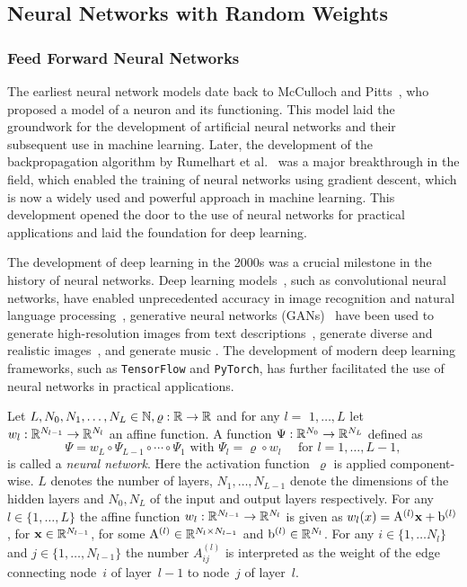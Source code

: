 \subsection{Neural Networks with Random Weights}

\subsubsection{Feed Forward Neural Networks}
The earliest neural network models date back to McCulloch and Pitts~\cite{McCulloch1943AActivity}, who proposed a model of a neuron and its functioning. This model laid the groundwork for the development of artificial neural networks and their subsequent use in machine learning. Later, the development of the backpropagation algorithm by Rumelhart et al.~\cite{Rumelhart1986LearningErrors} was a major breakthrough in the field, which enabled the training of neural networks using gradient descent, which is now a widely used and powerful approach in machine learning. This development opened the door to the use of neural networks for practical applications and laid the foundation for deep learning. 

The development of deep learning in the 2000s was a crucial milestone in the history of neural networks. Deep learning models~\cite{Goodfellow2016DeepLearning}, such as convolutional neural networks, have enabled unprecedented accuracy in image recognition and natural language processing~\cite{Gu2018RecentNetworks}, generative neural networks (GANs)~\cite{Goodfellow2020GenerativeNetworks} have been used to generate high-resolution images from text descriptions~\cite{Radford2015UnsupervisedNetworks}, generate diverse and realistic images~\cite{Karras2018ANetworks}, and generate music \cite{Engel2019GANSynth:Synthesis}. The development of modern deep learning frameworks, such as \texttt{TensorFlow} and \texttt{PyTorch}, has further facilitated the use of neural networks in practical applications. 


\begin{definition}\label{def:neuralnet}
Let $L, N_{0}, N_{1}, \ldots, N_{L} \in \mathbb{N}, \varrho: \mathbb{R} \rightarrow \mathbb{R}$ and for any $l=$
$1, \ldots, L$ let $w_{l}: \mathbb{R}^{N_{l-1}} \rightarrow \mathbb{R}^{N_{l}}$ an affine function. A function $\Psi: \mathbb{R}^{N_{0}} \rightarrow \mathbb{R}^{N_{L}}$
defined as
\[
\Psi=w_{L} \circ \Psi_{L-1} \circ \cdots \circ \Psi_{1} \text { with } \Psi_{l}=\varrho \circ w_{l} \quad \text { for } l=1, \ldots, L-1,
\]
is called a \textit{neural network}. Here the activation function~$\varrho$ is
applied component-wise. $L$ denotes the number of layers, $N_{1}, \ldots, N_{L-1}$ denote
the dimensions of the hidden layers and $N_{0}, N_{L}$ of the input and output layers respectively. 
For any $l\in\{1, \dots, L\}$ the affine function $w_{l}:\mathbb{R}^{N_{l-1}}\to\mathbb{R}^{N_{l}}$ is given as $w_{l}(x) = \mathrm{A}^{(l)} \boldsymbol{\mathrm{x}} + \mathrm{b}^{(l)}$,
for $\boldsymbol{\mathrm{x}}\in \mathbb{R}^{N_{l-1}}$, for some $\mathrm{A}^{(l)} \in \mathbb{R}^{N_{l}\times N_{l-1}} $ and $\mathrm{b}^{(l)} \in \mathbb{R}^{N_{l}}$.
For any $i\in\{1, \dots N_{l}\}$ and $j\in\{1, \dots, N_{l-1}\}$ the number $A_{i j}^{(l)}$ is interpreted as the weight of the edge connecting node~$i$ of layer~$l-1$ to node~$j$ of layer~$l$.
\end{definition}


